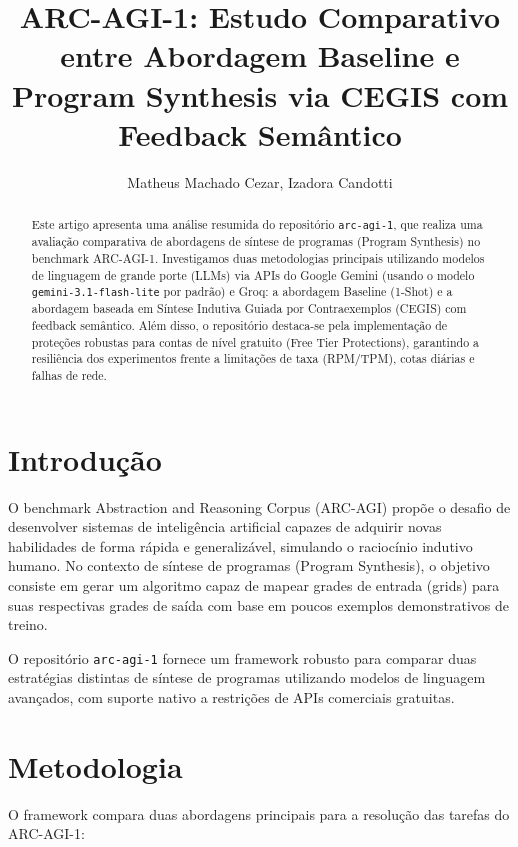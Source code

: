 \documentclass[letterpaper]{article} %
\title{ARC-AGI-1: Estudo Comparativo entre Abordagem Baseline e Program Synthesis via CEGIS com Feedback Sem{\^a}ntico}
\author{
    Matheus Machado Cezar, Izadora Candotti\\
}
\begin{document}
\maketitle

\begin{abstract}
Este artigo apresenta uma an{\'a}lise resumida do reposit{\'o}rio \texttt{arc-agi-1}, que realiza uma avalia{\c{c}}{\~a}o comparativa de abordagens de s{\'i}ntese de programas (Program Synthesis) no benchmark ARC-AGI-1. Investigamos duas metodologias principais utilizando modelos de linguagem de grande porte (LLMs) via APIs do Google Gemini (usando o modelo \texttt{gemini-3.1-flash-lite} por padr{\~a}o) e Groq: a abordagem Baseline (1-Shot) e a abordagem baseada em S{\'i}ntese Indutiva Guiada por Contraexemplos (CEGIS) com feedback sem{\^a}ntico. Al{\'e}m disso, o reposit{\'o}rio destaca-se pela implementa{\c{c}}{\~a}o de prote{\c{c}}{\~o}es robustas para contas de n{\'i}vel gratuito (Free Tier Protections), garantindo a resili{\^e}ncia dos experimentos frente a limita{\c{c}}{\~o}es de taxa (RPM/TPM), cotas di{\'a}rias e falhas de rede.
\end{abstract}

\begin{links}
\end{links}

\section{Introdu{\c{c}}{\~a}o}
O benchmark Abstraction and Reasoning Corpus (ARC-AGI) \cite{chollet2019measure} prop{\~o}e o desafio de desenvolver sistemas de intelig{\^e}ncia artificial capazes de adquirir novas habilidades de forma r{\'a}pida e generaliz{\'a}vel, simulando o racioc{\'i}nio indutivo humano. No contexto de s{\'i}ntese de programas (Program Synthesis), o objetivo consiste em gerar um algoritmo capaz de mapear grades de entrada (grids) para suas respectivas grades de sa{\'i}da com base em poucos exemplos demonstrativos de treino.

O reposit{\'o}rio \texttt{arc-agi-1} \cite{arcagi1repo} fornece um framework robusto para comparar duas estrat{\'e}gias distintas de s{\'i}ntese de programas utilizando modelos de linguagem avan{\c{c}}ados, com suporte nativo a restri{\c{c}}{\~o}es de APIs comerciais gratuitas.

\section{Metodologia}
O framework compara duas abordagens principais para a resolu{\c{c}}{\~a}o das tarefas do ARC-AGI-1:
\end{document}
